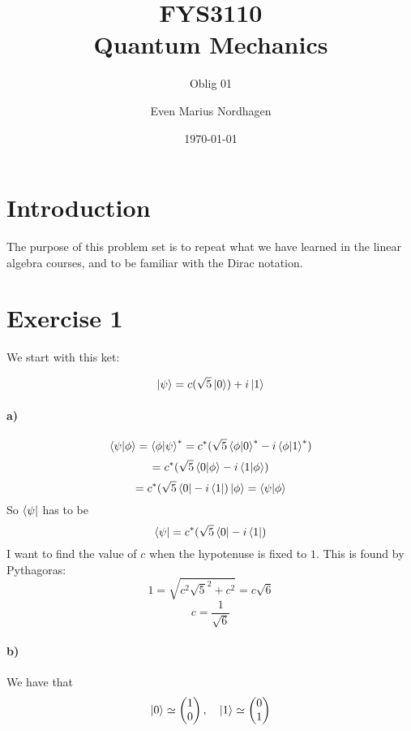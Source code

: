 \documentclass{scrartcl}
\title{FYS3110\\Quantum Mechanics}
\subtitle{Oblig 01}
\author{Even Marius Nordhagen}
\date{\today}
\begin{document}
\maketitle
\newpage
\section{Introduction}
The purpose of this problem set is to repeat what we have learned in the linear algebra courses, and to be familiar with the Dirac notation.

\section{Exercise 1}
We start with this ket:\par
\begin{equation}
\ket{\psi}=c(\sqrt{5}\ket{0})+i\ket{1}
\end{equation}
\paragraph{a)}
\begin{equation*}
\bra{\psi}\ket{\phi}=\bra{\phi}\ket{\psi}^*=c^*(\sqrt{5}\bra{\phi}\ket{0}^*-i\bra{\phi}\ket{1}^*)
\end{equation*}
\begin{equation*}
=c^*(\sqrt{5}\bra{0}\ket{\phi}-i\bra{1}\ket{\phi})
\end{equation*}
\begin{equation*}
=c^*(\sqrt{5}\bra{0}-i\bra{1})\ket{\phi}=\bra{\psi}\ket{\phi}
\end{equation*}
So $\bra{\psi}$ has to be
\begin{equation}
\bra{\psi}=c^*(\sqrt{5}\bra{0}-i\bra{1})
\end{equation}
I want to find the value of $c$ when the hypotenuse is fixed to $1$. This is found by Pythagoras:
\begin{equation*}
1=\sqrt{c^2\sqrt{5}^2+c^2}=c\sqrt{6}
\end{equation*}
\begin{equation}
c=\frac{1}{\sqrt{6}}
\end{equation}

\paragraph{b)}
We have that
$$\ket{0}\simeq\begin{pmatrix}1\\0\end{pmatrix},\quad \ket{1}\simeq\begin{pmatrix}0\\1\end{pmatrix}$$
\end{document}
